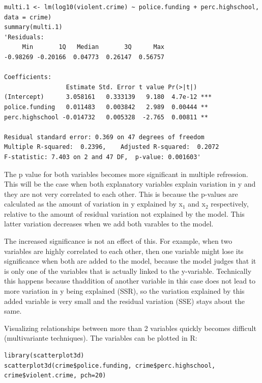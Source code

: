 \documentclass{article}
\begin{document}
\begin{lstlisting}
multi.1 <- lm(log10(violent.crime) ~ police.funding + perc.highschool, data = crime)
summary(multi.1)
'Residuals:
     Min       1Q   Median       3Q      Max 
-0.98269 -0.20166  0.04773  0.26147  0.56757 

Coefficients:
                 Estimate Std. Error t value Pr(>|t|)    
(Intercept)      3.058161   0.333139   9.180  4.7e-12 ***
police.funding   0.011483   0.003842   2.989  0.00444 ** 
perc.highschool -0.014732   0.005328  -2.765  0.00811 ** 

Residual standard error: 0.369 on 47 degrees of freedom
Multiple R-squared:  0.2396,	Adjusted R-squared:  0.2072 
F-statistic: 7.403 on 2 and 47 DF,  p-value: 0.001603'
\end{lstlisting}

The p value for both variables becomes more significant in multiple refression. This will be the case when both explanatory variables explain variation in y and they are not very correlated to each other. This is because the p-values are calculated as the amount of variation in y explained by x$_1$ and x$_2$ respectively, relative to the amount of residual variation not explained by the model. This latter variation decreases when we add both varables to the model. \par 
The increased significance is not an effect of this. For example, when two variables are highly correlated to each other, then one variable might lose its significance when both are added to the model, because the model judges that it is only one of the variables that is actually linked to the y-variable. Technically this happens because thaddition of another variable in this case does not lead to more variation in y being explained (SSR), so the variation explained by this added variable is very small and the residual variation (SSE) stays about the same.\par 
Visualizing relationships between more than 2 variables quickly becomes difficult (multivariante techniques). The variables can be plotted in R:

\begin{lstlisting}
library(scatterplot3d)
scatterplot3d(crime$police.funding, crime$perc.highschool, crime$violent.crime, pch=20)
\end{lstlisting}
\end{document}
